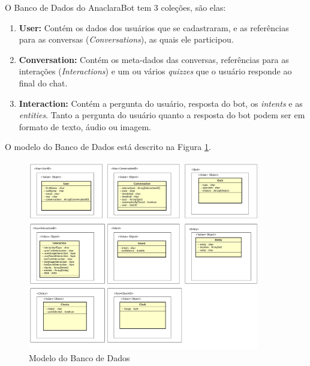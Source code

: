 
O Banco de Dados do AnaclaraBot tem 3 coleções, são elas:
\begin{enumerate}

\item \textbf{User:} Contém os dados dos usuários que se cadastraram, e as referências para as conversas (\emph{Conversations}), as quais ele participou.

\item \textbf{Conversation:} Contém os meta-dados das conversas, referências para as interações (\emph{Interactions}) e um ou vários \textit{quizzes} que o usuário responde ao final do chat.

\item \textbf{Interaction:} Contém a pergunta do usuário, resposta do bot, os \textit{intents} e as \textit{entities}. Tanto a pergunta do usuário quanto a resposta do bot podem ser em formato de texto, áudio ou imagem.

\end{enumerate}


\par O modelo do Banco de Dados está descrito na Figura \ref{fig:diagram}.
\begin{figure}[!ht]
  \centering
      \includegraphics[width=0.9\textwidth]{diagram}
  \caption{Modelo do Banco de Dados}
  \label{fig:diagram}
\end{figure}
